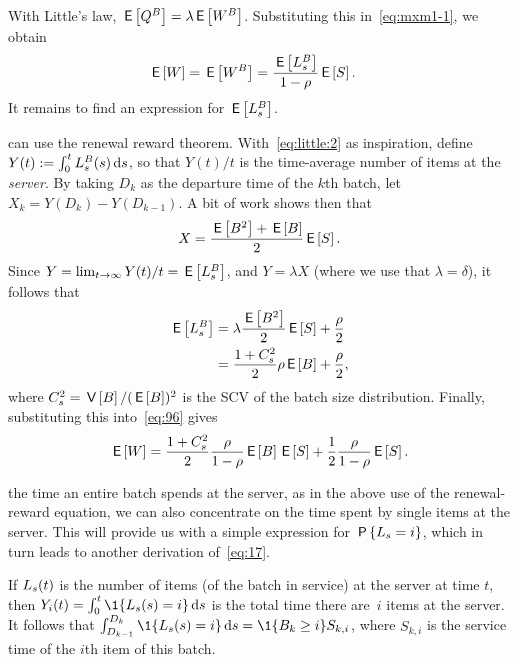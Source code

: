 With Little's law, $\,\mathsf{E}\left[Q^B\right] = \lambda \,\mathsf{E}\left[W^B\right]$.  Substituting this in~\cref{eq:mxm1-1}, we obtain
\begin{align}\label{eq:96}
\,\mathsf{E}\left[W\right] =  \,\mathsf{E}\left[W^B\right] &= \frac{\,\mathsf{E}\left[L_s^B\right]}{1-\rho}\,\mathsf{E}\left[S\right].
\end{align}
It remains to find an expression for $\,\mathsf{E}\left[L_s^B\right]$.

 can use the renewal reward theorem.
With~\cref{eq:little:2} as inspiration, define $Y(t) := \int_0^t L_s^B(s) \,\textrm{d}s$, so that $Y(t)/t$  is the time-average number of items at the \emph{server}.
By taking $D_k$ as the departure time of the $k$th batch, let $X_k = Y(D_k)-Y(D_{k-1})$. A bit of work  shows then that
\begin{equation}\label{eq:9}
  X = \frac{\,\mathsf{E}\left[B^2\right]+\,\mathsf{E}\left[B\right]}2 \,\mathsf{E}\left[S\right].
\end{equation}
Since $Y=\lim_{t\to\infty} Y(t)/t = \,\mathsf{E}\left[L_s^{B}\right]$, and $Y=\lambda X$ (where we use that $\lambda = \delta$), it follows that
\begin{align}
  \,\mathsf{E}\left[L_s^B\right] &= \lambda \frac{\,\mathsf{E}\left[B^2\right]}2\,\mathsf{E}\left[S\right] + \frac\rho 2 \label{eq:17}\\
  &= \frac{1+C_s^2}2 \rho \,\mathsf{E}\left[B\right] + \frac{\rho}{2},\label{eq:mxm1:1}
\end{align}
where $C_s^2 = \,\mathsf{V}\left[B\right]/ (\,\mathsf{E}\left[B\right])^{2}$ is the SCV of the batch size distribution. Finally, substituting this into~\cref{eq:96} gives
\begin{equation}\label{eq:43}
\,\mathsf{E}\left[W\right] =
\frac{1+C_s^2}2 \frac{\rho}{1-\rho} \,\mathsf{E}\left[B\right] \,\mathsf{E}\left[S\right] + \frac12\frac\rho{1-\rho} \,\mathsf{E}\left[S\right].
\end{equation}


 the time an entire batch spends at the server, as in the above use of the renewal-reward equation, we can also concentrate on the time spent by single items at the server.
This will provide us with a simple expression for $\,\mathsf{P}\left\{L_s=i\right\}$, which in turn leads to another derivation of~\cref{eq:17}.

If $L_s(t)$ is the number of items (of the batch in service) at the server at time $t$, then $Y_i(t) = \int_0^t \1{\Ls(s)=i} \d s$ is the total time there are~$i$ items at the server. It follows that
$\int_{ D_{k-1}}^{D_k} \1{\Ls(s)=i} \d s = \1{B_k \geq i} S_{k,i}$,
where $S_{k,i}$ is the service time of the $i$th item of this batch.


